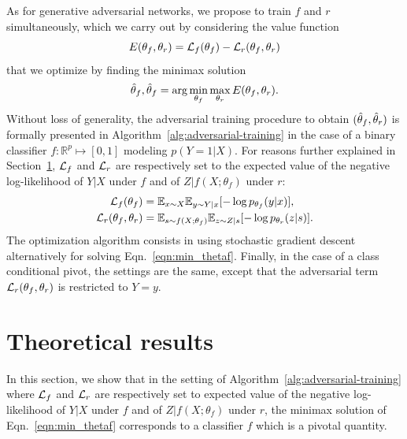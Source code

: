\documentclass[twocolumn,superscriptaddress,aps]{revtex4-1}
\theoremstyle{plain}
\begin{document}
As for generative adversarial networks, we propose to
train $f$ and $r$ simultaneously, which we carry out by considering
the value function
\begin{equation}
    E(\theta_f, \theta_r) = {\cal L}_f(\theta_f) - {\cal L}_r(\theta_f, \theta_r)
\end{equation}
that we optimize by finding the minimax solution
\begin{equation}\label{eqn:min_thetaf}
    \smash{\hat\theta_f, \hat\theta_f} = \arg \min_{\theta_f} \max_{\theta_r} E(\theta_f, \theta_r).
\end{equation}
Without loss of generality, the adversarial training procedure to obtain
$(\smash{\hat\theta_f}, \smash{\hat\theta_r})$ is formally presented in
Algorithm~\ref{alg:adversarial-training} in the case of a binary classifier $f :
\mathbb{R}^p \mapsto [0,1]$ modeling $p(Y=1|X)$. For reasons further explained
in Section~\ref{sec:theory}, ${\cal L}_f$ and ${\cal L}_r$  are respectively set to the
expected value of the
negative log-likelihood of $Y|X$ under $f$ and of $Z|f(X;\theta_f)$ under
$r$:
\begin{align}
    {\cal L}_f(\theta_f) &= \mathbb{E}_{x \sim X}  \mathbb{E}_{y \sim Y|x} [ -\log p_{\theta_f} (y|x) ], \\
    {\cal L}_r(\theta_f, \theta_r) &= \mathbb{E}_{s \sim f(X;\theta_f)}  \mathbb{E}_{z \sim Z|s} [-\log p_{\theta_r} (z|s)].
\end{align}
The optimization algorithm consists in using stochastic gradient descent
alternatively for solving Eqn.~\ref{eqn:min_thetaf}.
Finally, in the case of a class conditional pivot, the settings are the
same, except that the adversarial term ${\cal L}_r(\theta_f, \theta_r)$ is restricted to $Y=y$.





\section{Theoretical results}
\label{sec:theory}

In this section, we show that in the setting of
Algorithm~\ref{alg:adversarial-training} where ${\cal L}_f$ and ${\cal L}_r$ are
respectively set to expected value of the negative log-likelihood of $Y|X$ under
$f$ and of $Z|f(X;\theta_f)$ under $r$, the minimax solution of Eqn.~\ref{eqn:min_thetaf}
corresponds to a classifier
$f$ which is a pivotal quantity.
\end{document}

